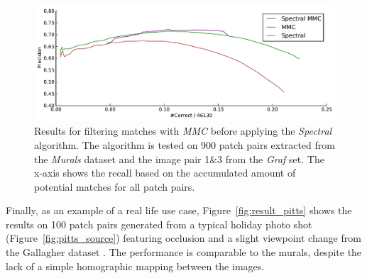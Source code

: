 \begin{figure}[htb]
	\centering
	\includegraphics[width=1\textwidth]{images/result_spectral-mmc}
	\caption{Results for filtering matches with \emph{MMC} before 
	applying the \emph{Spectral} algorithm. The algorithm is tested on 
900 patch pairs extracted from the \emph{Murals} dataset and the image 
pair 1\&3 from the \emph{Graf} set. The x-axis shows the recall based on 
the accumulated amount of potential matches for all patch pairs.}
	\label{fig:result_spectral-mmc}
\end{figure}

Finally, as an example of a real life use case, 
Figure~\ref{fig:result_pitts} shows the results on 100 patch pairs 
generated from a typical holiday photo shot 
(Figure~\ref{fig:pitts_source}) featuring occlusion and a slight 
viewpoint change from the Gallagher dataset \cite{gallagher2008}.  The 
performance is comparable to the murals, despite the lack of a simple 
homographic mapping between the images.


